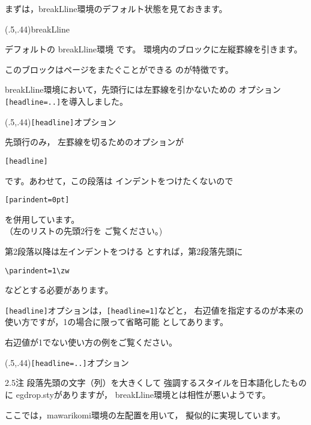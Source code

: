 \documentclass[a4j,fleqn]{jarticle}
\begin{document}
まずは，\textsf{breakLline}環境のデフォルト状態を見ておきます。

\begin{showEx}(.5,.44){\textsf{breakLline}}
\begin{breakLline}
デフォルトの
\textsf{breakLline}環境
です。
環境内のブロックに左縦罫線を引きます。

このブロックはページをまたぐことができる
のが特徴です。
\end{breakLline}
\smallskip
\end{showEx}

\textsf{breakLline}環境において，先頭行には左罫線を引かないための
オプション \verb+[headline=..]+を導入しました。

\begin{showEx}(.5,.44){\texttt{[headline]}オプション}
\begin{breakLline}%
    [parindent=0pt,headline]
先頭行のみ，
左罫線を切るためのオプションが
\begin{jquote}
\begin{verbatim}
[headline]
\end{verbatim}
\end{jquote}
です。あわせて，この段落は
インデントをつけたくないので
\begin{jquote}
\begin{verbatim}
[parindent=0pt]
\end{verbatim}
\end{jquote}
を併用しています。\\
（左のリストの先頭2行を
ご覧ください。)

\zw\relax
第2段落以降は左インデントをつける
とすれば，第2段落先頭に
\begin{jquote}
\begin{verbatim}
\parindent=1\zw
\end{verbatim}
\end{jquote}
などとする必要があります。
\end{breakLline}
\smallskip
\end{showEx}

\verb+[headline]+オプションは，\verb+[headline=1]+などと，
右辺値を指定するのが本来の使い方ですが，1の場合に限って省略可能
としてあります。

右辺値が1でない使い方の例をご覧ください。

\begin{showEx}(.5,.44){\texttt{[headline=..]}オプション}
\begin{breakLline}%
    [parindent=0pt,headline=2]
\begin{mawarikomi}[l]%
    {2.5\zw}{\Huge 注}
段落先頭の文字（列）を大きくして
強調するスタイルを日本語化したものに
\textsf{egdrop.sty}がありますが，
\textsf{breakLline}環境とは相性が悪いようです。
\end{mawarikomi}

\zw\relax
ここでは，\textsf{mawarikomi}環境の左配置を用いて，
擬似的に実現しています。
\end{breakLline}
\smallskip
\end{showEx}
\end{document}
